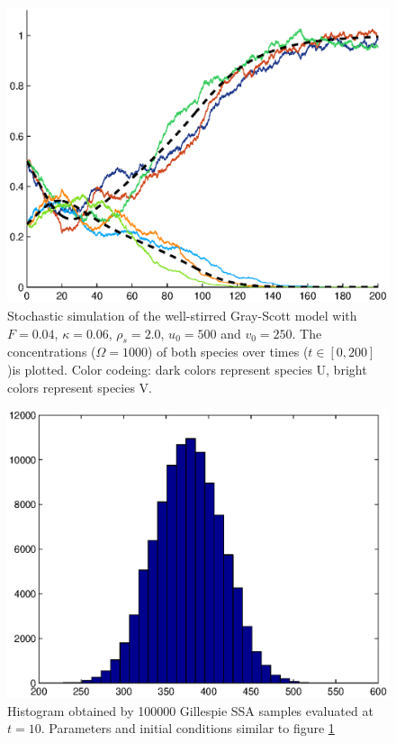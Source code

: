 \begin{figure}
\centering
\includegraphics[width=\textwidth]{images/gs_time_evolution.eps}
\caption{Stochastic simulation of the well-stirred Gray-Scott model with $F=0.04$, $\kappa=0.06$, $\rho_s = 2.0$, $u_0=500$ and $v_0=250$. The concentrations ($\Omega=1000$) of both species over times ($t\in[0,200]$)is plotted. Color codeing: dark colors represent species U, bright colors represent species V.}
\label{fig:gs_time_evolution}
\end{figure}

\begin{figure}
\centering
\includegraphics[width=\textwidth]{images/gs_hist_10.eps}
\caption{Histogram obtained by 100000 Gillespie SSA samples evaluated at $t=10$. Parameters and initial conditions similar to figure \ref{fig:gs_time_evolution}}
\label{fig:gs_hist_10}
\end{figure}

